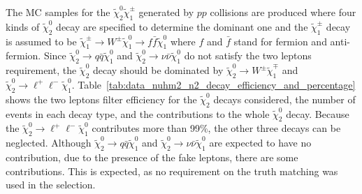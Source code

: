 
The MC samples for the $\widetilde{\chi}^{0}_{2} \widetilde{\chi}^{\pm}_{1}$ generated by $pp$ collisions are produced where four kinds of $\widetilde{\chi}^{0}_{2}$ decay are specified to determine the dominant one and the $\widetilde{\chi}^{\pm}_{1}$ decay is assumed to be $\widetilde{\chi}^{\pm}_{1} \to W^{\pm} \widetilde{\chi}^{0}_{1} \to f\bar{f} \widetilde{\chi}^{0}_{1}$ where $f$ and $\bar{f}$ stand for fermion and anti-fermion.
Since $\widetilde{\chi}^{0}_{2} \to q\bar{q} \widetilde{\chi}^{0}_{1}$ and $\widetilde{\chi}^{0}_{2} \to \nu\bar{\nu} \widetilde{\chi}^{0}_{1}$ do not satisfy the two leptons requirement, the $\widetilde{\chi}^{0}_{2}$ decay should be dominated by $\widetilde{\chi}^{0}_{2} \to W^{\pm} \widetilde{\chi}^{\mp}_{1}$ and $\widetilde{\chi}^{0}_{2} \to \ell^{+}\ell^{-} \widetilde{\chi}^{0}_{1}$.
Table~\ref{tab:data_nuhm2_n2_decay_efficiency_and_percentage} shows the two leptons filter efficiency for the $\widetilde{\chi}^{0}_{2}$ decays considered, the number of events in each decay type, and the contributions to the whole $\widetilde{\chi}^{0}_{2}$ decay.
Because the $\tilde{\chi}^{0}_{2} \to \ell^{+} \ell^{-} \tilde{\chi}^{0}_{1}$ contributes more than 99\%, the other three decays can be neglected.
Although $\tilde{\chi}^{0}_{2} \to q \bar{q} \tilde{\chi}^{0}_{1}$ and $\tilde{\chi}^{0}_{2} \to \nu \bar{\nu} \tilde{\chi}^{0}_{1}$ are expected to have no contribution, due to the presence of the fake leptons, there are some contributions.
This is expected, as no requirement on the truth matching was used in the selection.

